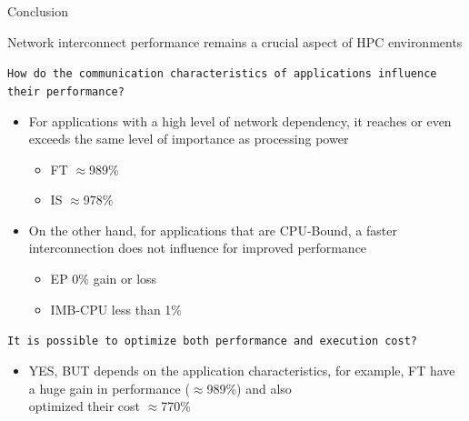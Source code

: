 \documentclass{beamer}
\begin{document}
\begin{frame}{Conclusion}

Network interconnect performance remains a \alert{crucial aspect of HPC environments}

\pause \texttt{How do the communication characteristics of applications influence their performance?}
\begin{itemize}
    \pause \item For applications with a high level of network dependency, it reaches or even exceeds the same level of importance as processing power
    \begin{itemize}
        \item FT $\approx$989\%
        \item IS $\approx$978\%
    \end{itemize} 
    \pause\item On the other hand, for applications that are CPU-Bound, a faster interconnection does not influence for improved performance
    \begin{itemize}
        \item EP 0\% gain or loss
        \item IMB-CPU less than 1\%
    \end{itemize}
\end{itemize}
\pause \texttt{It is possible to optimize both performance and execution cost?}
\begin{itemize}
    \pause\item YES, BUT depends on the application characteristics, for example, FT have a huge gain in performance ($\approx$989\%) and also\\ optimized their cost $\approx$770\%
\end{itemize}
\end{frame}
\end{document}
